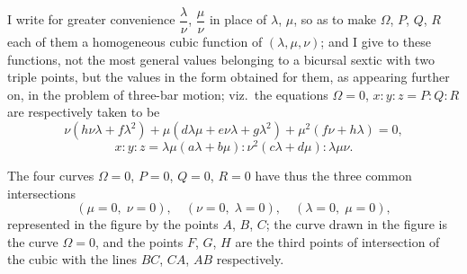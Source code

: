 \documentclass[11pt]{article}
\begin{document}
I write for greater convenience $\dfrac{\lambda}{\nu}$, $\dfrac{\mu}{\nu}$ in place of $\lambda$, $\mu$, so as to make $\Omega$, $P$, $Q$, $R$ each of them a homogeneous cubic function of $(\lambda, \mu, \nu)$; and I give to these functions, not the most general values belonging to a bicursal sextic with two triple points, but the values in the form obtained for them, as appearing further on, in the problem of three-bar motion; viz.\ the equations $\Omega = 0$, $x : y : z = P : Q : R$ are respectively taken to be
\[
\nu(h\nu\lambda + f\lambda^2) + \mu(d\lambda\mu + e\nu\lambda + g\lambda^2) + \mu^2(f\nu + h\lambda) = 0,
\]
\[
x : y : z = \lambda\mu(a\lambda + b\mu) : \nu^2(c\lambda + d\mu) : \lambda\mu\nu.
\]

The four curves $\Omega = 0$, $P = 0$, $Q = 0$, $R = 0$ have thus the three common intersections
\[
(\mu = 0,\;\nu = 0),\quad (\nu = 0,\;\lambda = 0),\quad (\lambda = 0,\;\mu = 0),
\]
represented in the figure by the points $A$, $B$, $C$; the curve drawn in the figure is the curve $\Omega = 0$, and the points $F$, $G$, $H$ are the third points of intersection of the cubic with the lines $BC$, $CA$, $AB$ respectively.

\smallskip
\begin{center}
\end{center}
\smallskip
\end{document}
